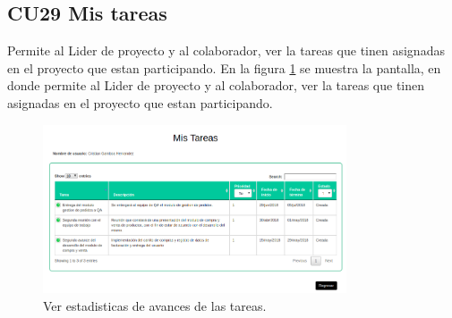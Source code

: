 \subsection{CU29 Mis tareas}
{
\justify
{}
}

\justify
Permite al Lider de proyecto y al colaborador, ver la tareas que tinen asignadas en el proyecto que estan participando.
{
\justify
{}
}
\justify
En la figura \ref{fig:IU29} se muestra la pantalla, en donde permite al Lider de proyecto y al colaborador, ver la tareas que tinen asignadas en el proyecto que estan participando.

\begin{figure}[htb]
\centering
\includegraphics[width=0.8\textwidth]{./images/cu29-mis-tareas.png}
\caption{Ver estadisticas de avances de las tareas.} \label{fig:IU29}
\end{figure}

\newpage